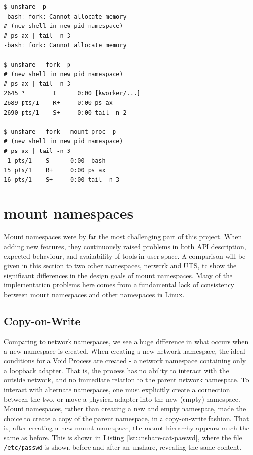 \documentclass[a4paper,12pt,twoside,openright]{report}
\begin{document}
\begin{lstlisting}[float,label={lst:unshare-pid}]
$ unshare -p
-bash: fork: Cannot allocate memory
# (new shell in new pid namespace)
# ps ax | tail -n 3
-bash: fork: Cannot allocate memory

$ unshare --fork -p
# (new shell in new pid namespace)
# ps ax | tail -n 3
2645 ?        I      0:00 [kworker/...]
2689 pts/1    R+     0:00 ps ax
2690 pts/1    S+     0:00 tail -n 2

$ unshare --fork --mount-proc -p
# (new shell in new pid namespace)
# ps ax | tail -n 3
 1 pts/1    S      0:00 -bash
15 pts/1    R+     0:00 ps ax
16 pts/1    S+     0:00 tail -n 3

\end{lstlisting}

\section{mount namespaces}
\label{sec:voiding-mount}

Mount namespaces were by far the most challenging part of this project. When adding new features, they continuously raised problems in both API description, expected behaviour, and availability of tools in user-space. A comparison will be given in this section to two other namespaces, network and UTS, to show the significant differences in the design goals of mount namespaces. Many of the implementation problems here comes from a fundamental lack of consistency between mount namespaces and other namespaces in Linux.

\subsection{Copy-on-Write}

Comparing to network namespaces, we see a huge difference in what occurs when a new namespace is created. When creating a new network namespace, the ideal conditions for a Void Process are created - a network namespace containing only a loopback adapter. That is, the process has no ability to interact with the outside network, and no immediate relation to the parent network namespace. To interact with alternate namespaces, one must explicitly create a connection between the two, or move a physical adapter into the new (empty) namespace. Mount namespaces, rather than creating a new and empty namespace, made the choice to create a copy of the parent namespace, in a copy-on-write fashion. That is, after creating a new mount namespace, the mount hierarchy appears much the same as before. This is shown in Listing \ref{lst:unshare-cat-passwd}, where the file \texttt{/etc/passwd} is shown before and after an unshare, revealing the same content.
\end{document}
